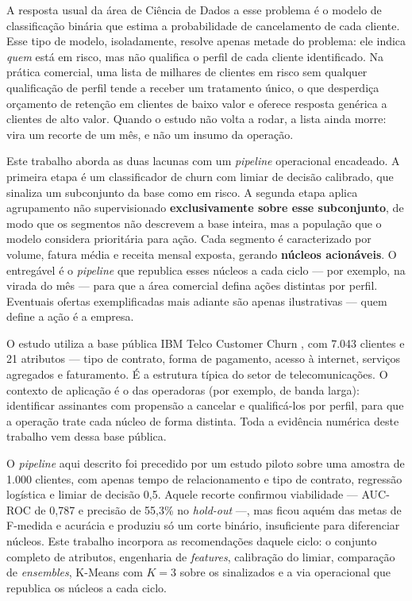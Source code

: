 \documentclass[12pt]{article}
\begin{document}
A resposta usual da área de Ciência de Dados a esse problema é o modelo de
classificação binária que estima a probabilidade de cancelamento de cada
cliente. Esse tipo de modelo, isoladamente, resolve apenas metade do problema:
ele indica \textit{quem} está em risco, mas não qualifica o perfil de
cada cliente identificado. Na prática comercial, uma lista de milhares de
clientes em risco sem qualquer qualificação de perfil tende a receber um
tratamento único, o que desperdiça orçamento de retenção em clientes de baixo
valor e oferece resposta genérica a clientes de alto valor. Quando o estudo
não volta a rodar, a lista ainda morre: vira um recorte de um mês, e não um
insumo da operação.

Este trabalho aborda as duas lacunas com um \textit{pipeline} operacional
encadeado. A primeira etapa é um classificador de churn com limiar de decisão
calibrado, que sinaliza um subconjunto da base como em risco. A segunda etapa
aplica agrupamento não supervisionado \textbf{exclusivamente sobre esse
subconjunto}, de modo que os segmentos não descrevem a base inteira, mas a
população que o modelo considera prioritária para ação. Cada segmento é
caracterizado por volume, fatura média e receita mensal exposta, gerando
\textbf{núcleos acionáveis}. O entregável é o \textit{pipeline} que republica
esses núcleos a cada ciclo --- por exemplo, na virada do mês --- para que a
área comercial defina ações distintas por perfil. Eventuais ofertas
exemplificadas mais adiante são apenas ilustrativas --- quem define a ação
é a empresa.

O estudo utiliza a base pública IBM Telco Customer Churn \cite{ibm2018}, com
7.043 clientes e 21 atributos --- tipo de contrato, forma de pagamento,
acesso à internet, serviços agregados e faturamento. É a estrutura típica
do setor de telecomunicações. O contexto de aplicação é o das operadoras
(por exemplo, de banda larga): identificar assinantes com propensão a
cancelar e qualificá-los por perfil, para que a operação trate cada núcleo
de forma distinta. Toda a evidência numérica deste trabalho vem dessa
base pública.

O \textit{pipeline} aqui descrito foi precedido por um estudo piloto sobre
uma amostra de 1.000 clientes, com apenas tempo de relacionamento e tipo de
contrato, regressão logística e limiar de decisão 0,5. Aquele recorte
confirmou viabilidade --- AUC-ROC de 0,787 e precisão de 55,3\% no
\textit{hold-out} ---, mas ficou aquém das metas de F-medida e acurácia e
produziu só um corte binário, insuficiente para diferenciar núcleos. Este
trabalho incorpora as recomendações daquele ciclo: o conjunto completo de
atributos, engenharia de \textit{features}, calibração do limiar, comparação
de \textit{ensembles}, K-Means com $K = 3$ sobre os sinalizados e a
via operacional que republica os núcleos a cada ciclo.
\end{document}
